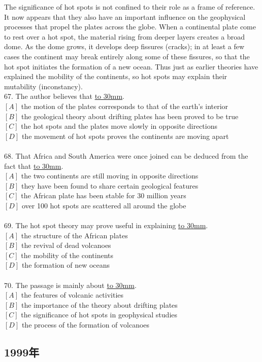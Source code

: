 \documentclass[a4paper]{article}
\begin{document}
\par
The significance of hot spots is not confined to their role as a frame of reference. It now appears that they also have an important influence on the geophysical processes that propel the plates across the globe. When a continental plate come to rest over a hot spot, the material rising from deeper layers creates a broad dome. As the dome grows, it develops deep fissures (cracks); in at least a few cases the continent may break entirely along some of these fissures, so that the hot spot initiates the formation of a new ocean. Thus just as earlier theories have explained the mobility of the continents, so hot spots may explain their mutability (inconstancy).
\\67.	The author believes that \underline{\hbox to 30mm{}}.\\$[A]$ the motion of the plates corresponds to that of the earth’s interior\\$[B]$ the geological theory about drifting plates has been proved to be true\\$[C]$ the hot spots and the plates move slowly in opposite directions\\$[D]$ the movement of hot spots proves the continents are moving apart\\\\68.	That Africa and South America were once joined can be deduced from the fact that \underline{\hbox to 30mm{}}.\\$[A]$ the two continents are still moving in opposite directions\\$[B]$ they have been found to share certain geological features\\$[C]$ the African plate has been stable for 30 million years\\$[D]$ over 100 hot spots are scattered all around the globe\\\\69.	The hot spot theory may prove useful in explaining \underline{\hbox to 30mm{}}.\\$[A]$ the structure of the African plates\\$[B]$ the revival of dead volcanoes\\$[C]$ the mobility of the continents\\$[D]$ the formation of new oceans\\\\70.	The passage is mainly about \underline{\hbox to 30mm{}}.\\$[A]$ the features of volcanic activities\\$[B]$ the importance of the theory about drifting plates\\$[C]$ the significance of hot spots in geophysical studies\\$[D]$ the process of the formation of volcanoes\\\subsection{1999年}
\end{document}
